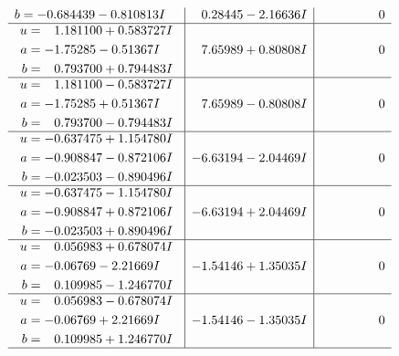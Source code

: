 \documentclass[1p]{elsarticle_modified}
\theoremstyle{definition}
\begin{document}
$$\begin{array}{c|c|c}
\begin{aligned}
b &= -0.684439 - 0.810813 I\end{aligned}
 & \phantom{-}0.28445 - 2.16636 I & \phantom{-0.000000 } 0 \\ \hline\begin{aligned}
u &= \phantom{-}1.181100 + 0.583727 I \\
a &= -1.75285 - 0.51367 I \\
b &= \phantom{-}0.793700 + 0.794483 I\end{aligned}
 & \phantom{-}7.65989 + 0.80808 I & \phantom{-0.000000 } 0 \\ \hline\begin{aligned}
u &= \phantom{-}1.181100 - 0.583727 I \\
a &= -1.75285 + 0.51367 I \\
b &= \phantom{-}0.793700 - 0.794483 I\end{aligned}
 & \phantom{-}7.65989 - 0.80808 I & \phantom{-0.000000 } 0 \\ \hline\begin{aligned}
u &= -0.637475 + 1.154780 I \\
a &= -0.908847 - 0.872106 I \\
b &= -0.023503 - 0.890496 I\end{aligned}
 & -6.63194 - 2.04469 I & \phantom{-0.000000 } 0 \\ \hline\begin{aligned}
u &= -0.637475 - 1.154780 I \\
a &= -0.908847 + 0.872106 I \\
b &= -0.023503 + 0.890496 I\end{aligned}
 & -6.63194 + 2.04469 I & \phantom{-0.000000 } 0 \\ \hline\begin{aligned}
u &= \phantom{-}0.056983 + 0.678074 I \\
a &= -0.06769 - 2.21669 I \\
b &= \phantom{-}0.109985 - 1.246770 I\end{aligned}
 & -1.54146 + 1.35035 I & \phantom{-0.000000 } 0 \\ \hline\begin{aligned}
u &= \phantom{-}0.056983 - 0.678074 I \\
a &= -0.06769 + 2.21669 I \\
b &= \phantom{-}0.109985 + 1.246770 I\end{aligned}
 & -1.54146 - 1.35035 I & \phantom{-0.000000 } 0\\
 \hline 
 \end{array}$$\newpage$$\begin{array}{c|c|c}  

\end{array}$$
\end{document}

